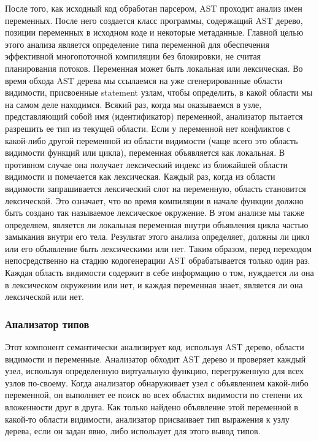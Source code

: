 После того, как исходный код обработан парсером, AST проходит анализ имен переменных.
После него создается класс программы, содержащий AST дерево, позиции переменных в исходном коде и некоторые метаданные.
Главной целью этого анализа является определение типа переменной для обеспечения эффективной многопоточной компиляции
без блокировки, не считая планирования потоков.
Переменная может быть локальная или лексическая.
Во время обхода AST дерева мы ссылаемся на уже сгенерированные области видимости, присвоенные statement узлам,
чтобы определить, в какой области мы на самом деле находимся.
Всякий раз, когда мы оказываемся в узле, представляющий собой имя (идентификатор) переменной,
анализатор пытается разрешить ее тип из текущей области.
Если у переменной нет конфликтов с какой-либо другой переменной из области видимости
(чаще всего это область видимости функций или цикла), переменная объявляется как локальная.
В противном случае она получает лексический индекс из ближайшей области видимости и помечается как лексическая.
Каждый раз, когда из области видимости запрашивается лексический слот на переменную, область становится лексической.
Это означает, что во время компиляции в начале функции должно быть создано так называемое лексическое окружение.
В этом анализе мы также определяем, является ли локальная переменная внутри объявления цикла частью замыкания
внутри его тела.
Результат этого анализа определяет, должны ли цикл или его объявление быть лексическими или нет.
Таким образом, перед переходом непосредственно на стадию кодогенерации AST обрабатывается только один раз.
Каждая область видимости содержит в себе информацию о том, нуждается ли она в лексическом окружении или нет,
и каждая переменная знает, является ли она лексической или нет.

\subsubsection{Анализатор типов}

Этот компонент семантически анализирует код, используя AST дерево, области видимости и переменные.
Анализатор обходит AST дерево и проверяет каждый узел, используя определенную виртуальную функцию,
перегруженную для всех узлов по-своему.
Когда анализатор обнаруживает узел с объявлением какой-либо переменной, он выполняет ее поиск во всех областях видимости
по степени их вложенности друг в друга.
Как только найдено объявление этой переменной в какой-то области видимости, анализатор присваивает тип выражения к узлу
дерева, если он задан явно, либо использует для этого вывод типов.

